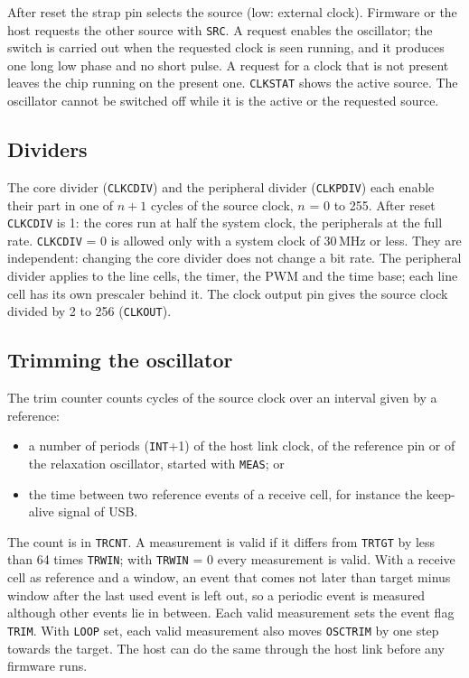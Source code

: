 \documentclass[10pt,a4paper]{article}
\newcommand{\reg}[1]{\texttt{#1}}
\begin{document}
After reset the strap pin selects the source (low: external clock). Firmware or the host requests the other
source with \reg{SRC}. A request enables the oscillator; the switch is carried out when the requested clock is
seen running, and it produces one long low phase and no short pulse. A request for a clock that is not present
leaves the chip running on the present one. \reg{CLKSTAT} shows the active source. The oscillator cannot be
switched off while it is the active or the requested source.

\subsection{Dividers}

The core divider (\reg{CLKCDIV}) and the peripheral divider (\reg{CLKPDIV}) each enable their part in one of
$n+1$ cycles of the source clock, $n$ = 0 to 255. After reset \reg{CLKCDIV} is 1: the cores run at half the
system clock, the peripherals at the full rate. \reg{CLKCDIV} = 0 is allowed only with a system clock of
30\,MHz or less. They are independent: changing the core divider does not
change a bit rate. The peripheral divider applies to the line cells, the timer, the PWM and the time base;
each line cell has its own prescaler behind it. The clock output pin gives the source clock divided by 2 to 256
(\reg{CLKOUT}).

\subsection{Trimming the oscillator}\label{sec:trim}

The trim counter counts cycles of the source clock over an interval given by a reference:

\begin{itemize}
\item a number of periods (\reg{INT}+1) of the host link clock, of the reference pin or of the relaxation
oscillator, started with \reg{MEAS}; or
\item the time between two reference events of a receive cell, for instance the keep-alive signal of USB.
\end{itemize}

The count is in \reg{TRCNT}. A measurement is valid if it differs from \reg{TRTGT} by less than 64 times
\reg{TRWIN}; with \reg{TRWIN} = 0 every measurement is valid. With a receive cell as reference and a window, an
event that comes not later than target minus window after the last used event is left out, so a periodic event
is measured although other events lie in between. Each valid measurement sets the event flag \reg{TRIM}. With
\reg{LOOP} set, each valid measurement also moves \reg{OSCTRIM} by one step towards the target. The host can do
the same through the host link before any firmware runs.
\end{document}
